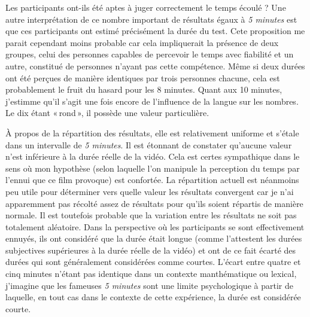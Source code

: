 \documentclass[12pt,fleqn,oneside,french,openany]{book} %
\begin{document}
Les participants ont-ils été aptes à juger correctement le temps écoulé ? Une autre interprétation de ce nombre important de résultats égaux à \emph{5 minutes} est que ces participants ont estimé précisément la durée du test. Cete proposition me parait cependant moins probable car cela impliquerait la présence de deux groupes, celui des personnes capables de percevoir le temps avec fiabilité et un autre, constitué de personnes n'ayant pas cette compétence. Même si deux durées ont été perçues de manière identiques par trois personnes chacune, cela est probablement le fruit du hasard pour les 8 minutes. Quant aux 10 minutes, j'estimme qu'il s'agit une fois encore de l'influence de la langue sur les nombres. Le dix étant «\,rond\,», il possède une valeur particulière.

À propos de la répartition des résultats, elle est relativement uniforme et s'étale dans un intervalle de \emph{5 minutes}. Il est étonnant de constater qu'aucune valeur n'est inférieure à la durée réelle de la vidéo. Cela est certes sympathique dans le sens où mon hypothèse (selon laquelle l'on manipule la perception du temps par l'ennui que ce film provoque) est confortée. La répartition actuell est néanmoins peu utile pour déterminer vers quelle valeur les résultats convergent car je n'ai apparemment pas récolté assez de résultats pour qu'ils soient répartis de manière normale. Il est toutefois probable que la variation entre les résultats ne soit pas totalement aléatoire. Dans la perspective où les participants se sont effectivement ennuyés, ils ont considéré que la durée était longue (comme l'attestent les durées subjectives supérieures à la durée réelle de la vidéo) et ont de ce fait écarté des durées qui sont généralement considérées comme courtes. L'écart entre quatre et cinq minutes n'étant pas identique dans un contexte manthématique ou lexical, j'imagine que les fameuses \emph{5 minutes} sont une limite psychologique à partir de laquelle, en tout cas dans le contexte de cette expérience, la durée est considérée courte. 
\end{document}
